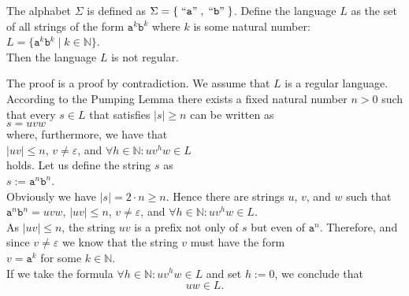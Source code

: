 \begin{Proposition}
  The alphabet  $\Sigma$ is defined as $\Sigma = \{ \;\mbox{``\texttt{a}''}\;, \;\mbox{``\texttt{b}''}\; \}$.
  Define the language $L$ as the set of all strings of the form $\mathtt{a}^k\mathtt{b}^k$ where $k$
  is some natural number:
  \\[0.2cm]
  \hspace*{1.3cm}
  $L = \bigl\{ \mathtt{a}^k\mathtt{b}^k \mid k \in \mathbb{N} \bigr\}$.
  \\[0.2cm]
  Then the language  $L$ is not regular.
\end{Proposition}

\proofEng
The proof is a proof by contradiction. We assume that $L$ is a regular language.  According to the
Pumping Lemma there exists a fixed natural number $n>0$ such that every $s \in L$ that satisfies  $|s|
\geq n$ can be written as
\\[0.2cm]
\hspace*{1.3cm}
$s = uvw$
\\[0.2cm]
where, furthermore, we have that
\\[0.2cm]
\hspace*{1.3cm}
$|uv| \leq n$, \quad $v \not= \varepsilon$, \quad and \quad $\forall h \in \mathbb{N}: uv^h w \in L$
\\[0.2cm]
holds.  Let us define the string $s$ as
\\[0.2cm]
\hspace*{1.3cm}
$s := \mathtt{a}^{n} \mathtt{b}^{n}$.
\\[0.2cm]
Obviously we have $|s| = 2 \cdot n \geq n$.  Hence there are strings $u$, $v$, and $w$
such that 
\\[0.2cm]
\hspace*{1.3cm}
$\mathtt{a}^{n}\mathtt{b}^{n} = uvw$, \quad $|uv| \leq n$, \quad $v \not= \varepsilon$, 
\quad and \quad $\forall h \in \mathbb{N}: uv^h w \in L$.
\\[0.2cm]
As $|uv| \leq n$, the string $uv$ is a prefix not only of $s$ but even of $\mathtt{a}^n$. Therefore,
and since $v \not= \varepsilon$ we know that the string $v$ must have the form
\\[0.2cm]
\hspace*{1.3cm}
$v = \mathtt{a}^k$ \quad for some $k \in \mathbb{N}$.
\\[0.2cm]
If we take the formula $\forall h \in \mathbb{N}: uv^h w \in L$ and set  $h:=0$, we conclude that
\begin{equation}
  \label{eq:pumping5}
 uw \in L. 
\end{equation}
